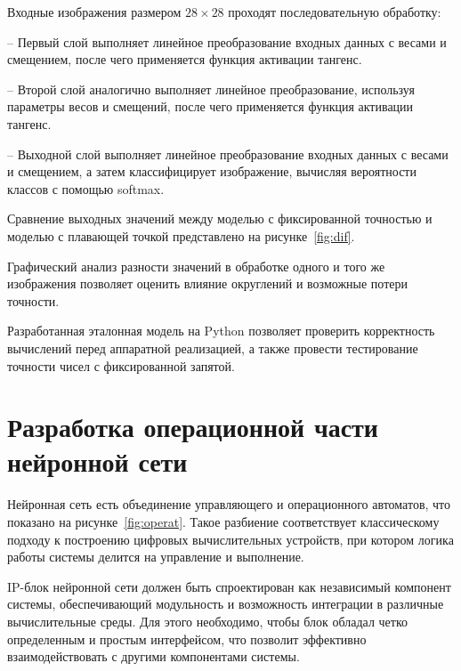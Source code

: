 Входные изображения размером \(28 \times 28\) проходят последовательную 
обработку:

  – Первый слой выполняет линейное преобразование входных данных с весами и 
смещением, после чего применяется функция активации тангенс.
    
  – Второй слой аналогично выполняет линейное преобразование, используя 
параметры весов и смещений, после чего применяется функция активации тангенс.
    
  – Выходной слой выполняет линейное преобразование входных данных с весами и 
смещением, а затем классифицирует изображение, вычисляя вероятности классов с 
помощью softmax.

Сравнение выходных значений между моделью с фиксированной точностью и моделью с
плавающей точкой представлено на рисунке~\ref{fig:dif}.  


Графический анализ разности значений в обработке одного и того же изображения 
позволяет оценить влияние округлений и возможные потери точности. 

Разработанная 
эталонная модель на Python позволяет проверить корректность вычислений перед 
аппаратной реализацией, а также провести тестирование точности чисел с 
фиксированной запятой.

\section{Разработка операционной части нейронной сети}
\hspace*{12.5 mm}Нейронная сеть есть объединение управляющего и операционного
автоматов, что показано на рисунке~\ref{fig:operat}. Такое разбиение 
соответствует классическому подходу к построению цифровых вычислительных 
устройств, при котором логика работы системы делится на управление и выполнение.


IP-блок нейронной сети должен быть спроектирован как независимый компонент 
системы, обеспечивающий модульность и возможность интеграции в различные 
вычислительные среды. Для этого необходимо, чтобы блок обладал четко 
определенным и простым интерфейсом, что позволит эффективно взаимодействовать 
с другими компонентами системы.

